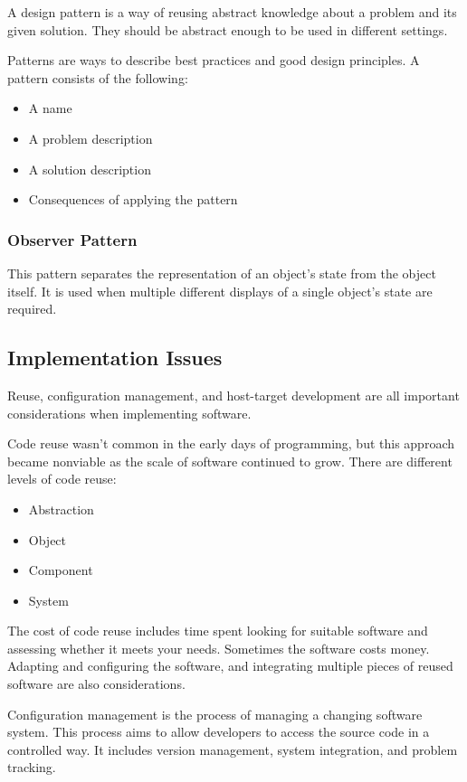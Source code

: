 \documentclass[12pt]{article}
\begin{document}
A design pattern is a way of reusing abstract knowledge about a problem and its
given solution. They should be abstract enough to be used in different
settings.

Patterns are ways to describe best practices and good design principles. A
pattern consists of the following:

\begin{itemize}
    \item A name
    \item A problem description
    \item A solution description
    \item Consequences of applying the pattern
\end{itemize}

\subsubsection*{Observer Pattern}

This pattern separates the representation of an object's state from the object
itself. It is used when multiple different displays of a single object's state
are required.

\subsection*{Implementation Issues}

Reuse, configuration management, and host-target development are all important
considerations when implementing software.

Code reuse wasn't common in the early days of programming, but this approach
became nonviable as the scale of software continued to grow. There are
different levels of code reuse:

\begin{itemize}
    \item Abstraction
    \item Object
    \item Component
    \item System
\end{itemize}

The cost of code reuse includes time spent looking for suitable software and
assessing whether it meets your needs. Sometimes the software costs money.
Adapting and configuring the software, and integrating multiple pieces of
reused software are also considerations.

Configuration management is the process of managing a changing software system.
This process aims to allow developers to access the source code in a controlled
way. It includes version management, system integration, and problem tracking.
\end{document}
